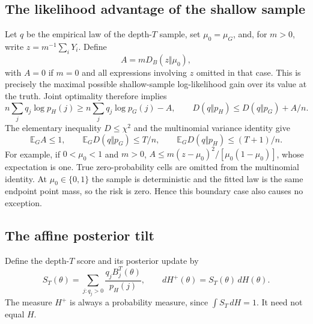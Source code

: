 \documentclass[11pt,a4paper]{article}
\theoremstyle{definition}
\theoremstyle{remark}
\numberwithin{equation}{section}
\begin{document}
\subsection{The likelihood advantage of the shallow sample}

Let $q$ be the empirical law of the depth-$T$ sample, set $\mu_0=\mu_G$,
and, for $m>0$, write $z=m^{-1}\sum_iY_i$.  Define
\[
 A=mD_B(z\Vert\mu_0),
\]
with $A=0$ if $m=0$ and all expressions involving $z$ omitted in that case.
This is precisely the maximal possible shallow-sample log-likelihood gain
over its value at the truth.  Joint optimality therefore implies
\begin{equation}\label{p3:eq:het-basic}
 n\sum_jq_j\log p_H(j)
       \ge n\sum_jq_j\log p_G(j)-A,
 \qquad
 D(q\Vert p_H)\le D(q\Vert p_G)+A/n.
\end{equation}
The elementary inequality $D\le\chi^2$ and the multinomial variance
identity give
\begin{equation}\label{p3:eq:het-entropy-mean}
 \mathbb E_G A\le1,
 \qquad \mathbb E_GD(q\Vert p_G)\le T/n,
 \qquad \mathbb E_GD(q\Vert p_H)\le(T+1)/n.
\end{equation}
For example, if $0<\mu_0<1$ and $m>0$,
$A\le m(z-\mu_0)^2/[\mu_0(1-\mu_0)]$, whose expectation is one.
True zero-probability cells are omitted from the multinomial identity.
At $\mu_0\in\{0,1\}$ the sample is deterministic and the fitted law is
the same endpoint point mass, so the risk is zero.  Hence this boundary
case also causes no exception.

\subsection{The affine posterior tilt}

Define the depth-$T$ score and its posterior update by
\begin{equation}\label{p3:eq:het-score}
 S_T(\theta)=\sum_{j:q_j>0}
                 \frac{q_jB_j^T(\theta)}{p_H(j)},
 \qquad dH^+(\theta)=S_T(\theta)\,dH(\theta).
\end{equation}
The measure $H^+$ is always a probability measure, since
$\int S_T\,dH=1$.  It need not equal $H$.
\end{document}
